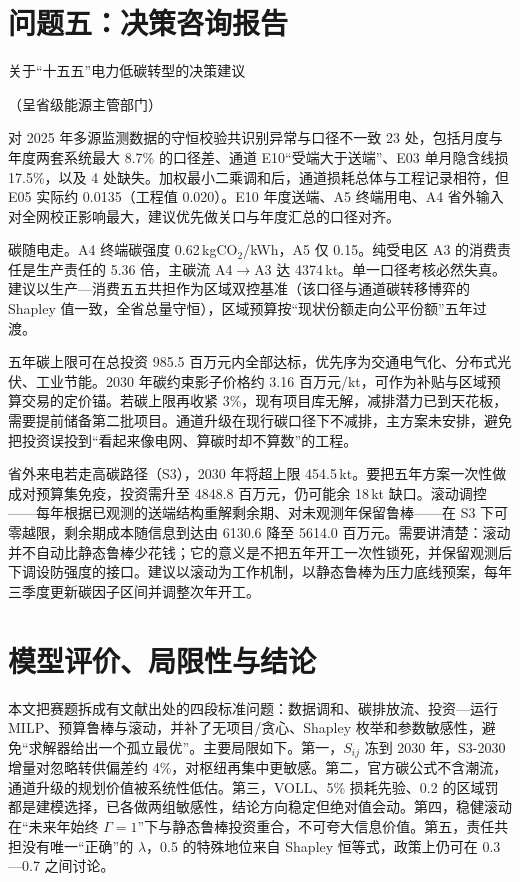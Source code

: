 \documentclass[UTF8,a4paper,zihao=-4,fontset=fandol]{ctexart}
\begin{document}
\section{问题五：决策咨询报告}

{\heiti 关于“十五五”电力低碳转型的决策建议}

{\kaishu （呈省级能源主管部门）}

\vspace{0.3em}
对 2025 年多源监测数据的守恒校验共识别异常与口径不一致 23 处，包括月度与年度两套系统最大 8.7\% 的口径差、通道 E10“受端大于送端”、E03 单月隐含线损 17.5\%，以及 4 处缺失。加权最小二乘调和后，通道损耗总体与工程记录相符，但 E05 实际约 0.0135（工程值 0.020）。E10 年度送端、A5 终端用电、A4 省外输入对全网校正影响最大，建议优先做关口与年度汇总的口径对齐。

碳随电走。A4 终端碳强度 0.62\,kgCO$_2$/kWh，A5 仅 0.15。纯受电区 A3 的消费责任是生产责任的 5.36 倍，主碳流 A4$\to$A3 达 4374\,kt。单一口径考核必然失真。建议以生产—消费五五共担作为区域双控基准（该口径与通道碳转移博弈的 Shapley 值一致，全省总量守恒），区域预算按“现状份额走向公平份额”五年过渡。

五年碳上限可在总投资 985.5 百万元内全部达标，优先序为交通电气化、分布式光伏、工业节能。2030 年碳约束影子价格约 3.16 百万元/kt，可作为补贴与区域预算交易的定价锚。若碳上限再收紧 3\%，现有项目库无解，减排潜力已到天花板，需要提前储备第二批项目。通道升级在现行碳口径下不减排，主方案未安排，避免把投资误投到“看起来像电网、算碳时却不算数”的工程。

省外来电若走高碳路径（S3），2030 年将超上限 454.5\,kt。要把五年方案一次性做成对预算集免疫，投资需升至 4848.8 百万元，仍可能余 18\,kt 缺口。滚动调控——每年根据已观测的送端结构重解剩余期、对未观测年保留鲁棒——在 S3 下可零越限，剩余期成本随信息到达由 6130.6 降至 5614.0 百万元。需要讲清楚：滚动并不自动比静态鲁棒少花钱；它的意义是不把五年开工一次性锁死，并保留观测后下调设防强度的接口。建议以滚动为工作机制，以静态鲁棒为压力底线预案，每年三季度更新碳因子区间并调整次年开工。

\section{模型评价、局限性与结论}

本文把赛题拆成有文献出处的四段标准问题：数据调和、碳排放流、投资—运行 MILP、预算鲁棒与滚动，并补了无项目/贪心、Shapley 枚举和参数敏感性，避免“求解器给出一个孤立最优”。主要局限如下。第一，$S_{ij}$ 冻到 2030 年，S3-2030 增量对忽略转供偏差约 4\%，对枢纽再集中更敏感。第二，官方碳公式不含潮流，通道升级的规划价值被系统性低估。第三，VOLL、5\% 损耗先验、0.2 的区域罚都是建模选择，已各做两组敏感性，结论方向稳定但绝对值会动。第四，稳健滚动在“未来年始终 $\Gamma=1$”下与静态鲁棒投资重合，不可夸大信息价值。第五，责任共担没有唯一“正确”的 $\lambda$，0.5 的特殊地位来自 Shapley 恒等式，政策上仍可在 0.3—0.7 之间讨论。
\end{document}
